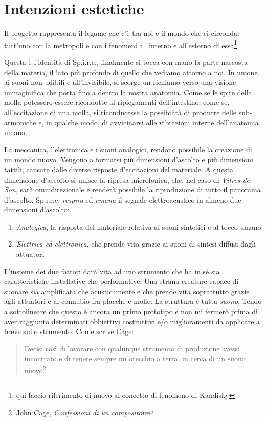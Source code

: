 \section{Intenzioni estetiche}
Il progetto rappresenta il legame che c'è tra noi e il mondo che ci circonda: tutt'uno con la metropoli e con i fenomeni all'interno e all'esterno di essa\footnote{qui faccio riferimento di nuovo al concetto di fenomeno di Kandisky}.

Questa è l'identità di Sp.i.r.e., finalmente si tocca con mano la parte nascosta della materia, il lato più profondo di quello che vediamo attorno a noi. In unione ai suoni non udibili e all'invisibile, si scorge un richiamo verso una visione immaginifica che porta fino a dentro la nostra anatomia. Come se le spire della molla potessero essere ricondotte ai ripiegamenti dell'intestino; come se, all'eccitazione di una molla, si riconducesse la possibilità di produrre delle sub-armoniche e, in qualche modo, di avvicinarsi alle vibrazioni interne dell'anatomia umana.

La meccanica, l'elettronica e i suoni analogici, rendono possibile la creazione di un mondo nuovo. Vengono a formarsi più dimensioni d'ascolto e più dimensioni tattili, causate dalle diverse risposte d'eccitazioni del materiale. A questa dimensione d'ascolto si unisce la ripresa microfonica, che, nel caso di \textit{Vitres de Son}, sarà omnidirezionale e renderà possibile la riproduzione di tutto il panorama d'ascolto. Sp.i.r.e. \textit{respira} ed \textit{emana} il segnale elettroacustico in almeno due dimensioni d'ascolto:
\begin{enumerate}
\item{\textit{Analogica}, la risposta del materiale relativa ai suoni sintetici e al tocco umano}
\item{\textit{Elettrica ed elettronica}, che prende vita grazie ai suoni di sintesi diffusi dagli attuatori}
\end{enumerate}

L'insieme dei due fattori darà vita ad uno strumento che ha in sé sia caratteristiche installative che performative. Una strana creature capace di suonare sia amplificata che acusticamente e che prende vita soprattutto grazie agli attuatori e al connubio fra placche e molle. La struttura è tutta \textit{suono}. Tendo a sottolineare che questo è ancora un primo prototipo e non mi fermerò prima di aver raggiunto determinati obbiettivi costruttivi e/o miglioramenti da applicare a breve sullo strumento. Come scrive Cage:
\begin{small}
\begin{quotation}
Decisi così di lavorare con qualunque strumento di produzione avessi incontrato e di tenere sempre un orecchio a terra, in cerca di un suono nuovo\footnote{John Cage, \textit{Confessioni di un compositore}}.
\end{quotation}
\end{small}

